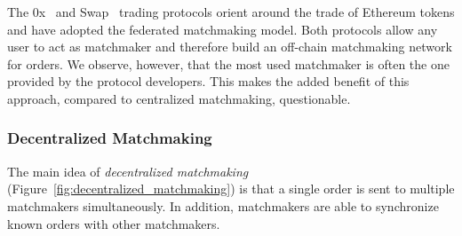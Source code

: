 


The 0x~\cite{warren20170x} and Swap~\cite{airswap} trading protocols orient around the trade of Ethereum tokens and have adopted the federated matchmaking model.
Both protocols allow any user to act as matchmaker and therefore build an off-chain matchmaking network for orders.
We observe, however, that the most used matchmaker is often the one provided by the protocol developers.
This makes the added benefit of this approach, compared to centralized matchmaking, questionable.

\subsubsection{Decentralized Matchmaking}
The main idea of \emph{decentralized matchmaking} (Figure~\ref{fig:decentralized_matchmaking}) is that a single order is sent to multiple matchmakers simultaneously.
In addition, matchmakers are able to synchronize known orders with other matchmakers.

